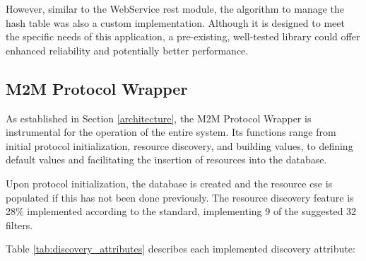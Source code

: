 \documentclass[a4paper,fleqn]{cas-dc}
\begin{document}
However, similar to the WebService \gls{rest} module, the algorithm to manage the hash table was also a custom implementation. Although it is designed to meet the specific needs of this application, a pre-existing, well-tested library could offer enhanced reliability and potentially better performance.

\subsection{M2M Protocol Wrapper}

As established in Section \ref{architecture}, the M2M Protocol Wrapper is instrumental for the operation of the entire system. Its functions range from initial protocol initialization, resource discovery, and building values, to defining default values and facilitating the insertion of resources into the database.

Upon protocol initialization, the database is created and the resource \gls{cse} is populated if this has not been done previously. The resource discovery feature is 28\% implemented according to the standard, implementing 9 of the suggested 32 filters.

Table \ref{tab:discovery_attributes} describes each implemented discovery attribute:
\end{document}
